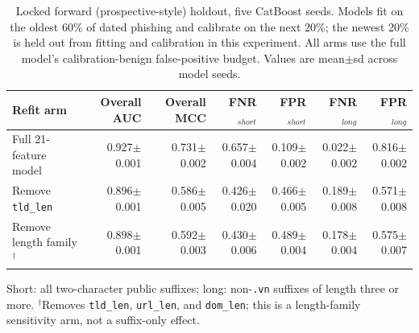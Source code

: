 \begin{table}[t]\centering
\caption{Locked forward (prospective-style) holdout, five CatBoost seeds. Models fit
on the oldest 60\% of dated phishing and calibrate on the next 20\%; the newest 20\%
is held out from fitting and calibration in this experiment. All arms use the full model's calibration-benign
false-positive budget. Values are mean$\pm$sd across model seeds.}
\label{tab:prospectiveablation}
\footnotesize\setlength{\tabcolsep}{4pt}
\begin{tabular}{lrrrrrr}\toprule
Refit arm & Overall AUC & Overall MCC & FNR$_{short}$ & FPR$_{short}$ & FNR$_{long}$ & FPR$_{long}$ \\ \midrule
Full 21-feature model & 0.927$\pm$0.001 & 0.731$\pm$0.002 & 0.657$\pm$0.004 & 0.109$\pm$0.002 & 0.022$\pm$0.002 & 0.816$\pm$0.002 \\
Remove \texttt{tld\_len} & 0.896$\pm$0.001 & 0.586$\pm$0.005 & 0.426$\pm$0.020 & 0.466$\pm$0.005 & 0.189$\pm$0.008 & 0.571$\pm$0.008 \\
Remove length family$^{\dagger}$ & 0.898$\pm$0.001 & 0.592$\pm$0.003 & 0.430$\pm$0.006 & 0.489$\pm$0.004 & 0.178$\pm$0.004 & 0.575$\pm$0.007 \\
\bottomrule\end{tabular}
\begin{minipage}{0.97\linewidth}\vspace{2pt}\footnotesize
Short: all two-character public suffixes; long: non-\texttt{.vn} suffixes of length
three or more. $^{\dagger}$Removes \texttt{tld\_len}, \texttt{url\_len}, and
\texttt{dom\_len}; this is a length-family sensitivity arm, not a suffix-only effect.
\end{minipage}\end{table}
